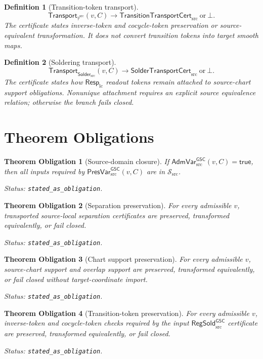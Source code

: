 \documentclass[11pt]{article}
\newcommand{\RespLC}{\mathsf{Resp}_{\mathrm{lc}}}
\newcommand{\RegSold}{\mathsf{RegSold}_{\mathrm{src}}^{\mathsf{GSC}}}
\newcommand{\AdmVar}{\mathsf{AdmVar}_{\mathrm{src}}^{\mathsf{GSC}}}
\newcommand{\PresVar}{\mathsf{PresVar}_{\mathrm{src}}^{\mathsf{GSC}}}
\newcommand{\SolderSrc}{\mathsf{Solder}_{\mathrm{src}}}
\newcommand{\Tau}{\widehat{\tau}^{\mathrm{src}}}
\newcommand{\Bot}{\bot}
\newtheorem{definition}{Definition}
\newtheorem{obligation}{Theorem Obligation}
\begin{document}
\begin{definition}[Transition-token transport]
\[
  \mathsf{Transport}_{\Tau}(v,C)
  \longrightarrow
  \mathsf{TransitionTransportCert}_{\mathrm{src}}
  \ \text{or}\ \Bot .
\]
The certificate states inverse-token and cocycle-token preservation or
source-equivalent transformation. It does not convert transition tokens into
target smooth maps.
\end{definition}

\begin{definition}[Soldering transport]
\[
  \mathsf{Transport}_{\SolderSrc}(v,C)
  \longrightarrow
  \mathsf{SolderTransportCert}_{\mathrm{src}}
  \ \text{or}\ \Bot .
\]
The certificate states how \(\RespLC\) readout tokens remain attached to
source-chart support obligations. Nonunique attachment requires an explicit
source equivalence relation; otherwise the branch fails closed.
\end{definition}

\section{Theorem Obligations}

\begin{obligation}[Source-domain closure]
If \(\AdmVar(v,C)=\mathsf{true}\), then all inputs required by
\(\PresVar(v,C)\) are in \(\mathcal{S}_{\mathrm{src}}\).

Status: \texttt{stated\_as\_obligation}.
\end{obligation}

\begin{obligation}[Separation preservation]
For every admissible \(v\), transported source-local separation certificates
are preserved, transformed equivalently, or fail closed.

Status: \texttt{stated\_as\_obligation}.
\end{obligation}

\begin{obligation}[Chart support preservation]
For every admissible \(v\), source-chart support and overlap support are
preserved, transformed equivalently, or fail closed without target-coordinate
import.

Status: \texttt{stated\_as\_obligation}.
\end{obligation}

\begin{obligation}[Transition-token preservation]
For every admissible \(v\), inverse-token and cocycle-token checks required by
the input \(\RegSold\) certificate are preserved, transformed equivalently, or
fail closed.

Status: \texttt{stated\_as\_obligation}.
\end{obligation}
\end{document}
